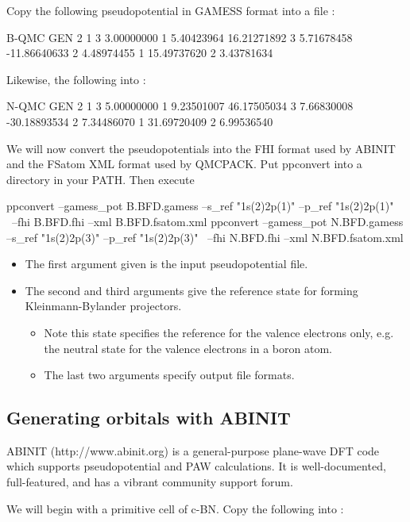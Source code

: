 Copy the following pseudopotential in GAMESS format into a file :
\begin{code}
B-QMC GEN 2 1
3
3.00000000 1 5.40423964
16.21271892 3 5.71678458
-11.86640633 2 4.48974455
1
15.49737620 2 3.43781634
\end{code}

Likewise, the following into :
\begin{code}
N-QMC GEN 2 1
3
5.00000000 1 9.23501007
46.17505034 3 7.66830008
-30.18893534 2 7.34486070
1
31.69720409 2 6.99536540
\end{code}

We will now convert the pseudopotentials into the FHI format used by ABINIT and the FSatom XML format used by QMCPACK. Put ppconvert into a directory in your PATH. Then execute
\begin{code}
ppconvert --gamess_pot B.BFD.gamess --s_ref "1s(2)2p(1)" --p_ref "1s(2)2p(1)" \
          --fhi B.BFD.fhi --xml B.BFD.fsatom.xml
ppconvert --gamess_pot N.BFD.gamess --s_ref "1s(2)2p(3)" --p_ref "1s(2)2p(3)" \
          --fhi N.BFD.fhi --xml N.BFD.fsatom.xml
\end{code}
\begin{itemize}
  \item{} The first argument given is the input pseudopotential file.
  \item{} The second and third arguments give the reference state for forming Kleinmann-Bylander projectors.
  \begin{itemize}
    \item{} Note this state specifies the reference for the valence electrons only, e.g. the neutral state for the valence electrons in a boron atom.
    \item{} The last two arguments specify output file formats. 
  \end{itemize}
\end{itemize}

\subsection*{Generating orbitals with ABINIT}
ABINIT (http://www.abinit.org) is a general-purpose plane-wave DFT code which supports pseudopotential and PAW calculations.  It is well-documented, full-featured, and has a vibrant community support forum.

We will begin with a primitive cell of c-BN. Copy the following into \iterm{cBNprim.in}:

